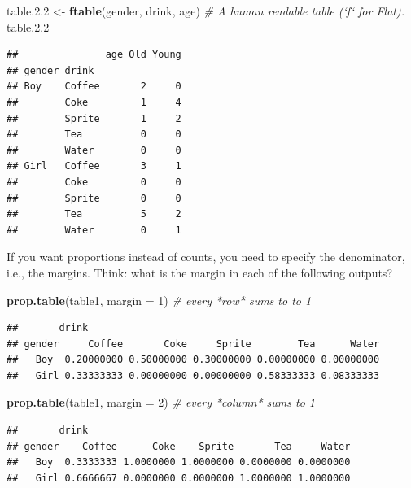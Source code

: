 \documentclass[]{book}
\newenvironment{Shaded}{\begin{snugshade}}{\end{snugshade}}
\newcommand{\CommentTok}[1]{\textcolor[rgb]{0.56,0.35,0.01}{\textit{#1}}}
\newcommand{\DataTypeTok}[1]{\textcolor[rgb]{0.13,0.29,0.53}{#1}}
\newcommand{\DecValTok}[1]{\textcolor[rgb]{0.00,0.00,0.81}{#1}}
\newcommand{\FloatTok}[1]{\textcolor[rgb]{0.00,0.00,0.81}{#1}}
\newcommand{\KeywordTok}[1]{\textcolor[rgb]{0.13,0.29,0.53}{\textbf{#1}}}
\newcommand{\NormalTok}[1]{#1}
\newcommand{\StringTok}[1]{\textcolor[rgb]{0.31,0.60,0.02}{#1}}
\theoremstyle{definition}
\theoremstyle{definition}
\theoremstyle{definition}
\theoremstyle{remark}
\begin{document}
\begin{Shaded}
\begin{Highlighting}[]
\NormalTok{table.}\FloatTok{2.2}\NormalTok{ <-}\StringTok{ }\KeywordTok{ftable}\NormalTok{(gender, drink, age) }\CommentTok{# A human readable table (`f` for Flat).}
\NormalTok{table.}\FloatTok{2.2}
\end{Highlighting}
\end{Shaded}

\begin{verbatim}
##               age Old Young
## gender drink               
## Boy    Coffee       2     0
##        Coke         1     4
##        Sprite       1     2
##        Tea          0     0
##        Water        0     0
## Girl   Coffee       3     1
##        Coke         0     0
##        Sprite       0     0
##        Tea          5     2
##        Water        0     1
\end{verbatim}

If you want proportions instead of counts, you need to specify the denominator, i.e., the margins.
Think: what is the margin in each of the following outputs?

\begin{Shaded}
\begin{Highlighting}[]
\KeywordTok{prop.table}\NormalTok{(table1, }\DataTypeTok{margin =} \DecValTok{1}\NormalTok{) }\CommentTok{# every *row* sums to to 1}
\end{Highlighting}
\end{Shaded}

\begin{verbatim}
##       drink
## gender     Coffee       Coke     Sprite        Tea      Water
##   Boy  0.20000000 0.50000000 0.30000000 0.00000000 0.00000000
##   Girl 0.33333333 0.00000000 0.00000000 0.58333333 0.08333333
\end{verbatim}

\begin{Shaded}
\begin{Highlighting}[]
\KeywordTok{prop.table}\NormalTok{(table1, }\DataTypeTok{margin =} \DecValTok{2}\NormalTok{) }\CommentTok{# every *column* sums to 1}
\end{Highlighting}
\end{Shaded}

\begin{verbatim}
##       drink
## gender    Coffee      Coke    Sprite       Tea     Water
##   Boy  0.3333333 1.0000000 1.0000000 0.0000000 0.0000000
##   Girl 0.6666667 0.0000000 0.0000000 1.0000000 1.0000000
\end{verbatim}
\end{document}
